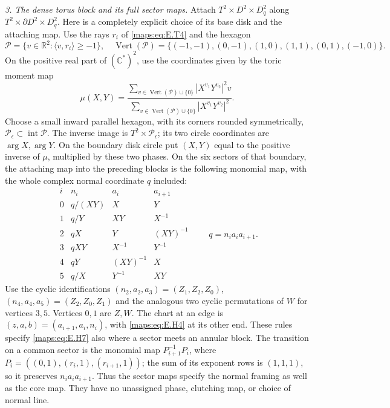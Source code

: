 \begin{theorem}
\emph{3. The dense torus block and its full sector maps.}
Attach $T^2\times D^2\times D^2_q$ along
$T^2\times\partial D^2\times D^2_q$.  Here is a completely explicit
choice of its base disk and the attaching map.  Use the rays
$r_i$ of \eqref{maps:eq:E.T4} and the hexagon
\[
 \mathcal P=\{v\in\mathbb R^2:\langle v,r_i\rangle\geq-1\},
 \quad
 \operatorname{Vert}(\mathcal P)=
 \{(-1,-1),(0,-1),(1,0),(1,1),(0,1),(-1,0)\}.
 \tag{E.H5}\label{maps:eq:E.H5}
\]
On the positive real part of $(\mathbb C^*)^2$, use the coordinates
given by the toric moment map
\[
 \mu(X,Y)=
 \frac{\displaystyle\sum_{v\in\operatorname{Vert}(\mathcal P)\cup\{0\}}
                 |X^{v_1}Y^{v_2}|^2v}
      {\displaystyle\sum_{v\in\operatorname{Vert}(\mathcal P)\cup\{0\}}
                 |X^{v_1}Y^{v_2}|^2}.
 \tag{E.H6}\label{maps:eq:E.H6}
\]
Choose a small inward parallel hexagon, with its corners rounded
symmetrically, $\mathcal P_\epsilon\subset\operatorname{int}\mathcal P$.
The inverse image is $T^2\times\mathcal P_\epsilon$; its two circle
coordinates are $\arg X,\arg Y$.  On the boundary disk circle put
$(X,Y)$ equal to the positive inverse of $\mu$, multiplied by these
two phases.  On the six sectors of that boundary, the attaching
map into the preceding blocks is the following monomial map, with
the whole complex normal coordinate $q$ included:
\[
\begin{array}{c|ccc}
 i& n_i&a_i&a_{i+1}\\ \hline
0&q/(XY)&X&Y\\
1&q/Y&XY&X^{-1}\\
2&qX&Y&(XY)^{-1}\\
3&qXY&X^{-1}&Y^{-1}\\
4&qY&(XY)^{-1}&X\\
5&q/X&Y^{-1}&XY
\end{array}
\qquad q=n_i a_i a_{i+1}.
\tag{E.H7}\label{maps:eq:E.H7}
\]
Use the cyclic identifications
$(n_2,a_2,a_3)=(Z_1,Z_2,Z_0)$,
$(n_4,a_4,a_5)=(Z_2,Z_0,Z_1)$ and the analogous two cyclic
permutations of $W$ for vertices $3,5$.  Vertices $0,1$ are $Z,W$.
The chart at an edge is $(z,a,b)=(a_{i+1},a_i,n_i)$, with \eqref{maps:eq:E.H4}
at its other end.  These rules specify \eqref{maps:eq:E.H7} also where a sector
meets an annular block.  The transition on a common sector is the
monomial map $P_{i+1}^{-1}P_i$, where
$P_i=((0,1),(r_i,1),(r_{i+1},1))$; the sum of its exponent rows
is $(1,1,1)$, so it preserves $n_i a_i a_{i+1}$.  Thus the sector maps specify the
normal framing as well as the core map.  They have no unassigned
phase, clutching map, or choice of normal line.


\end{theorem}
